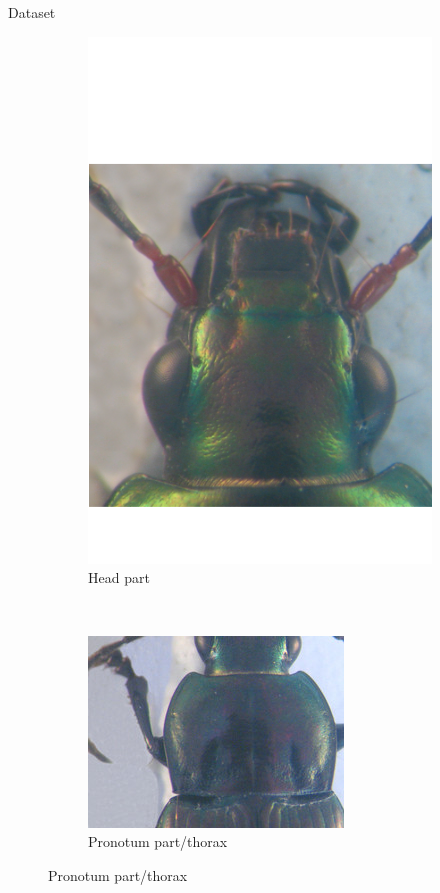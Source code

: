 \documentclass[10pt,svgnames]{beamer}
\begin{document}
\begin{frame}[c]{Dataset}
\begin{figure}[htbp]
\begin{subfigure}[t]{0.3\textwidth}
        			\includegraphics[scale=.2]{images/tete2}
        			\caption*{\footnotesize{Head part}}
        			\label{figsub22}
    			\end{subfigure}
    			~ 
    			\begin{subfigure}[t]{0.33\textwidth}
        			\centering
        			\includegraphics[scale=1.1]{images/pronotum2}
        			\caption*{\footnotesize{Pronotum part/thorax}}
        			\label{figsub22}
    			\end{subfigure}
			\end{figure}
\end{frame}

\end{document}
